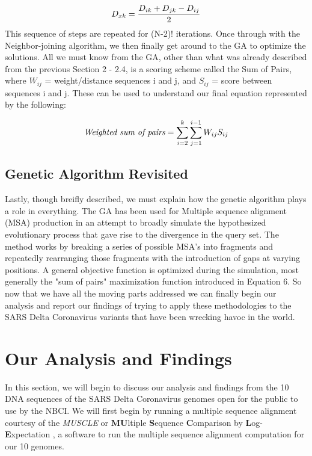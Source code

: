 \begin{equation}
\label{branch-length}
D_{xk}=\frac{D_{ik}+D_{jk}-D_{ij}}{2}\\
\end{equation}
This sequence of steps are repeated for (N-2)! iterations. Once through with the Neighbor-joining algorithm, we then finally get around to the GA to optimize the solutions. All we must know from the GA, other than what was already described from the previous Section 2 - 2.4, is a scoring scheme called the Sum of Pairs, where $W_{ij}$ = weight/distance sequences i and j, and $S_{ij}$ = score between sequences i and j. These can be used to understand our final equation represented by the following:

\begin{equation}
\label{branch-length}
\emph{Weighted sum of pairs} = \sum_{i=2}^{k} \sum_{j=1}^{i-1}W_{ij}S_{ij}
\end{equation}

\subsection{Genetic Algorithm Revisited}

Lastly, though breifly described, we must explain how the genetic algorithm plays a role in everything. The GA has been used for Multiple sequence alignment (MSA) production in an attempt to broadly simulate the hypothesized evolutionary process that gave rise to the divergence in the query set. The method works by breaking a series of possible MSA's into fragments and repeatedly rearranging those fragments with the introduction of gaps at varying positions. A general objective function is optimized during the simulation, most generally the "sum of pairs" maximization function introduced in Equation 6. So now that we have all the moving parts addressed we can finally begin our analysis and report our findings of trying to apply these methodologies to the SARS Delta Coronavirus variants that have been wrecking havoc in the world. 

\section{Our Analysis and Findings}

In this section, we will begin to discuss our analysis and findings from the 10 DNA sequences of the SARS Delta Coronavirus genomes open for the public to use by the NBCI. We will first begin by running a multiple sequence alignment courtesy of the \emph{MUSCLE} or \textbf{MU}ltiple \textbf{S}equence \textbf{C}omparison by \textbf{L}og-\textbf{E}xpectation \cite{Madeira}, a software to run the multiple sequence alignment computation for our 10 genomes.    
 


